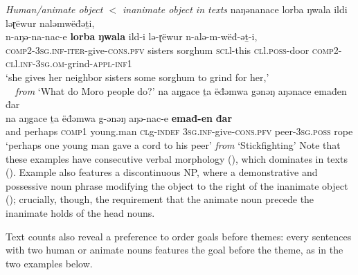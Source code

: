 \ea \textit{Human/animate object $<$ inanimate object in texts}
\ea naŋənanace lorba ŋwala ildi ləɽëwur naləmwëđəṯi,\\
\gll n-aŋə-na-nac-e \textbf{lorba} \textbf{ŋwala} ild-i lə-ɽëwur n-alə-m-wëđ-əṯ-i,\\
\textsc{comp2-3sg.inf-iter}-give-\textsc{cons.pfv} sisters sorghum \textsc{scl}l-this  \textsc{cl}l.\textsc{poss}-door \textsc{comp2-cl}l\textsc{.inf}-\textsc{3sg.om}-grind-\textsc{appl-inf1}\\
\glt `she gives her neighbor sisters some sorghum to grind for her,' \\ \ \ \hfill \textit{from} `What do Moro people do?' \label{ex:ch12:anin1}
\ex na aŋgace ṯa ëđəmwa gǝnǝŋ aŋənace emađen đar\\
\gll na aŋgace ṯa ëđəmwa  g-ǝnǝŋ aŋə-nac-e \textbf{emađ-en} \textbf{đar}\\
 and perhaps \textsc{comp1} young.man \textsc{cl}g-\textsc{indef} \textsc{3sg.inf}-give-\textsc{cons.pfv}  peer\textsc{-3sg.poss} rope\\
\glt `perhaps one young man gave a cord to his peer' \hfill \textit{from} `Stickfighting'
\z 
\z
Note that these examples have consecutive verbal morphology (), which dominates in texts (). Example  also features a discontinuous NP, where a demonstrative and possessive noun phrase modifying the object to the right of the inanimate object (); crucially, though, the requirement that the animate noun precede the inanimate holds of the head nouns.

Text counts also reveal a preference to order goals before themes: every sentences with two human or animate nouns features the goal before the theme, as in the two examples below.

